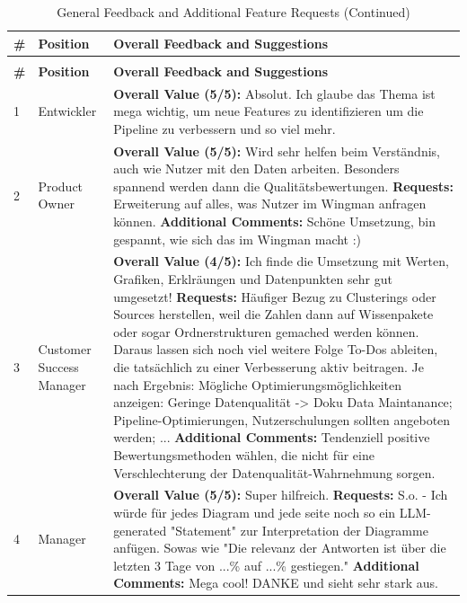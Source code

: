 \documentclass[
	english,
	ruledheaders=section,%
	class=report,%
	thesis={type=bachelor},%
	accentcolor=1b,%
	custommargins=true,%
	marginpar=false,%
	parskip=half-,%
	fontsize=11pt,%
	DIV=14,
]{tudapub}
\begin{document}
\begin{longtable}{l >{\RaggedRight}p{3cm} >{\RaggedRight}p{10cm}}
    \caption{General Feedback and Additional Feature Requests}
    \label{tab:general_feedback}\\
    \toprule
    \textbf{\#} & \textbf{Position} & \textbf{Overall Feedback and Suggestions} \\
    \midrule
    \endfirsthead
    \caption[]{General Feedback and Additional Feature Requests (Continued)}\\
    \toprule
    \textbf{\#} & \textbf{Position} & \textbf{Overall Feedback and Suggestions} \\
    \midrule
    \endhead
    \bottomrule
    \endlastfoot

    1 & Entwickler & \textbf{Overall Value (5/5):} Absolut. Ich glaube das Thema ist mega wichtig, um neue Features zu identifizieren um die Pipeline zu verbessern und so viel mehr. \\
    \midrule
    2 & Product Owner & \textbf{Overall Value (5/5):} Wird sehr helfen beim Verständnis, auch wie Nutzer mit den Daten arbeiten. Besonders spannend werden dann die Qualitätsbewertungen. \textbf{Requests:} Erweiterung auf alles, was Nutzer im Wingman anfragen können. \textbf{Additional Comments:} Schöne Umsetzung, bin gespannt, wie sich das im Wingman macht :) \\
    \midrule
    3 & Customer Success Manager & \textbf{Overall Value (4/5):} Ich finde die Umsetzung mit Werten, Grafiken, Erklräungen und Datenpunkten sehr gut umgesetzt! \textbf{Requests:} Häufiger Bezug zu Clusterings oder Sources herstellen, weil die Zahlen dann auf Wissenpakete oder sogar Ordnerstrukturen gemached werden können. Daraus lassen sich noch viel weitere Folge To-Dos ableiten, die tatsächlich zu einer Verbesserung aktiv beitragen. Je nach Ergebnis: Mögliche Optimierungsmöglichkeiten anzeigen: Geringe Datenqualität -> Doku Data Maintanance; Pipeline-Optimierungen, Nutzerschulungen sollten angeboten werden; ... \textbf{Additional Comments:} Tendenziell positive Bewertungsmethoden wählen, die nicht für eine Verschlechterung der Datenqualität-Wahrnehmung sorgen. \\
    \midrule
    4 & Manager & \textbf{Overall Value (5/5):} Super hilfreich. \textbf{Requests:} S.o. - Ich würde für jedes Diagram und jede seite noch so ein LLM-generated "Statement" zur Interpretation der Diagramme anfügen. Sowas wie "Die relevanz der Antworten ist über die letzten 3 Tage von ...\% auf ...\% gestiegen." \textbf{Additional Comments:} Mega cool! DANKE und sieht sehr stark aus. \\

\end{longtable}
\end{document}

